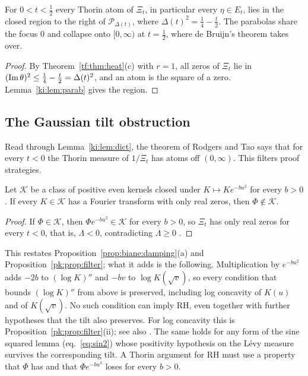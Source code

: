 \begin{corollary}\label{ki:cor:parab}
For $0<t<\tfrac12$ every Thorin atom of $\Xi_t$, in particular every $\eta\in E_t$, lies in the closed region to the right of $\mathcal P_{\Delta(t)}$, where $\Delta(t)^2=\tfrac14-\tfrac t2$. The parabolas share the focus $0$ and collapse onto $[0,\infty)$ at $t=\tfrac12$, where de Bruijn's theorem takes over.
\end{corollary}

\begin{proof}
By Theorem~\ref{tf:thm:heat}(c) with $r=1$, all zeros of $\Xi_t$ lie in $(\operatorname{Im}\theta)^2\le\tfrac14-\tfrac t2=\Delta(t)^2$, and an atom is the square of a zero. Lemma~\ref{ki:lem:parab} gives the region.
\end{proof}

\subsection{The Gaussian tilt obstruction}\label{ki:sec:obstruction}

Read through Lemma~\ref{ki:lem:dict}, the theorem of Rodgers and Tao says that for every $t<0$ the Thorin measure of $1/\Xi_t$ has atoms off $(0,\infty)$. This filters proof strategies.

\begin{proposition}\label{ki:prop:obstruction}
Let $\mathcal K$ be a class of positive even kernels closed under $K\mapsto Ke^{-bu^2}$ for every $b>0$. If every $K\in\mathcal K$ has a Fourier transform with only real zeros, then $\Phi\notin\mathcal K$.
\end{proposition}

\begin{proof}
If $\Phi\in\mathcal K$, then $\Phi e^{-bu^2}\in\mathcal K$ for every $b>0$, so $\Xi_t$ has only real zeros for every $t<0$, that is, $\Lambda<0$, contradicting $\Lambda\ge0$ \cite{RodgersTao}.
\end{proof}

This restates Proposition~\ref{prop:biane:damping}(a) and Proposition~\ref{pk:prop:filter}; what it adds is the following. Multiplication by $e^{-bu^2}$ adds $-2b$ to $(\log K)''$ and $-bv$ to $\log K(\sqrt v)$, so every condition that bounds $(\log K)''$ from above is preserved, including log concavity of $K(u)$ and of $K(\sqrt v)$. No such condition can imply RH, even together with further hypotheses that the tilt also preserves. For log concavity this is Proposition~\ref{pk:prop:filter}(ii); see also \cite{Newton26}. The same holds for any form of the sine squared lemma (eq.~\eqref{eq:sin2}) whose positivity hypothesis on the L\'evy measure survives the corresponding tilt. A Thorin argument for RH must use a property that $\Phi$ has and that $\Phi e^{-bu^2}$ loses for every $b>0$.

